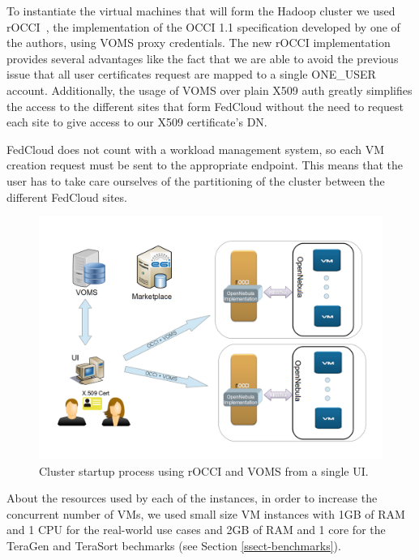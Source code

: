 To instantiate the virtual machines that will form the Hadoop cluster we used rOCCI~\cite{rocci}, the implementation of the OCCI 1.1 specification developed by one of the authors, using VOMS proxy credentials. The new rOCCI implementation provides several advantages like the fact that we are able to avoid the previous issue that all user certificates request are mapped to a single ONE\_USER account.
Additionally, the usage of VOMS over plain X509 auth greatly simplifies the access to the different sites that form FedCloud without the need to request each site to give access to our X509 certificate's DN.

FedCloud does not count with a workload management system, so each VM creation request must be sent to the appropriate endpoint. This means that the user has to take care ourselves of the partitioning of the cluster between the different FedCloud sites.


\begin{figure}[h]
\centering
\includegraphics[width=\textwidth]{figures/client-v2.png}
\caption{Cluster startup process using rOCCI and VOMS from a single UI.}
\label{fig:client}
\end{figure}

About the resources used by each of the instances, in order to increase the concurrent number of VMs, we used small size VM instances with 1GB of RAM and 1 CPU for the real-world use cases and 2GB of RAM and 1 core for the TeraGen and TeraSort bechmarks (see Section \ref{ssect-benchmarks}).


